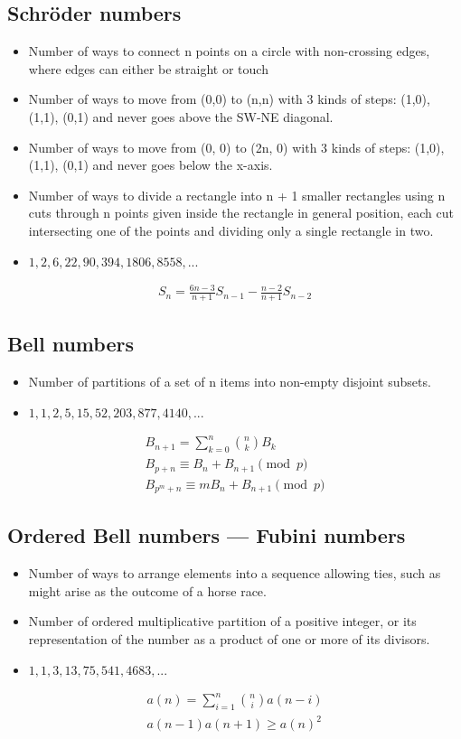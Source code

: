 \documentclass{article}
\begin{document}
\subsection{Schröder numbers}
\begin{itemize}
    \item Number of ways to connect n points on a circle with non-crossing edges, where edges can either be straight or touch
    \item Number of ways to move from (0,0) to (n,n) with 3 kinds of steps: (1,0), (1,1), (0,1) and never goes above the SW-NE diagonal.
    \item Number of ways to move from (0, 0) to (2n, 0) with 3 kinds of steps: (1,0), (1,1), (0,1) and never goes below the x-axis.
    \item Number of ways to divide a rectangle into n + 1 smaller rectangles using n cuts through n points given inside the rectangle in general position, each cut intersecting one of the points and dividing only a single rectangle in two.
    \item $1, 2, 6, 22, 90, 394, 1806, 8558, ...$
\end{itemize}
\begin{align*}
    S_n = \frac{6n - 3}{n + 1} S_{n-1} - \frac{n - 2}{n + 1} S_{n-2}
\end{align*}

\subsection{Bell numbers}
\begin{itemize}
\item Number of partitions of a set of n items into non-empty disjoint subsets.
\item $1, 1, 2, 5, 15, 52, 203, 877, 4140, ...$
\end{itemize}
\begin{align*}
    B_{n+1} = \sum_{k=0}^{n} \binom{n}{k} B_k\\
    B_{p+n} \equiv B_n + B_{n+1} \pmod{p}\\
    B_{p^m+n} \equiv mB_n + B_{n+1} \pmod{p}
\end{align*}

\subsection{Ordered Bell numbers --- Fubini numbers}
\begin{itemize}
\item Number of ways to arrange elements into a sequence allowing ties, such as might arise as the outcome of a horse race.
\item Number of ordered multiplicative partition of a positive integer, or its representation of the number as a product of one or more of its divisors.
\item $1, 1, 3, 13, 75, 541, 4683, ...$
\end{itemize}
\begin{align*}
    a(n) = \sum_{i=1}^{n} \binom{n}{i} a(n-i)\\
    a(n-1) a(n+1) \geq a(n)^2
\end{align*}
\end{document}
